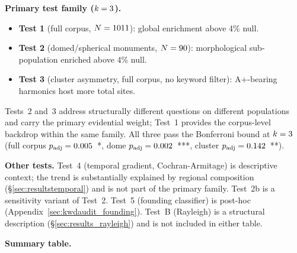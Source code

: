 \documentclass[HARVARD,twocolumn]{USG}
\begin{document}
\textbf{Primary test family ($k = \BonfK$).}
\begin{itemize}
  \item \textbf{Test 1} (full corpus, $N = 1011$):
    global enrichment above 4\% null.
  \item \textbf{Test 2} (domed/spherical monuments, $N = 90$):
    morphological sub-population enriched above 4\% null.
  \item \textbf{Test 3} (cluster asymmetry, full corpus, no keyword filter):
    A+-bearing harmonics host more total sites.
\end{itemize}
Tests~2 and~3 address structurally different questions on different
populations and carry the primary evidential weight; Test~1 provides the
corpus-level backdrop within the same family.
All three pass the Bonferroni bound at $k = \BonfK$
(full corpus $p_\mathrm{adj} = 0.005$~*,
dome $p_\mathrm{adj} = 0.002$~***,
cluster $p_\mathrm{adj} = 0.142$~**).

\textbf{Other tests.}
Test~4 (temporal gradient, Cochran-Armitage) is descriptive context;
the trend is substantially explained by regional composition
(\S\ref{sec:resultstemporal}) and is not part of the primary family.
Test~2b is a sensitivity variant of Test~2.
Test~5 (founding classifier) is post-hoc (Appendix~\ref{sec:kwdaudit_founding}).
Test~B (Rayleigh) is a structural description (\S\ref{sec:results_rayleigh})
and is not included in either table.

\textbf{Summary table.}

\begin{table}[!t]
\centering\small
\caption{Multiple-comparisons summary.
  Primary test family: Tests~1--3 ($k = \BonfK$, $\alpha = 0.05/\BonfK$).}
\label{tab:bonferroni_both}
\end{table}
\end{document}
